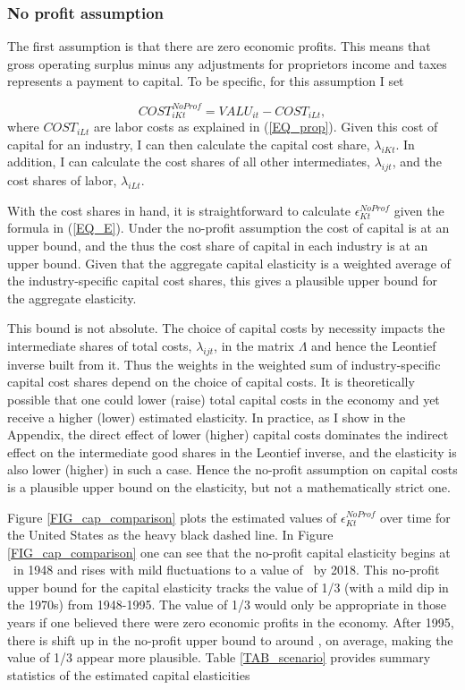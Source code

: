 \documentclass[11pt]{article}
\begin{document}
\subsubsection{No profit assumption}
The first assumption is that there are zero economic profits. This means that gross operating surplus minus any adjustments for proprietors income and taxes represents a payment to capital. To be specific, for this assumption I set

\begin{equation}
	COST^{NoProf}_{iKt} = VALU_{it} - COST_{iLt},  \label{EQ_noprofit}
\end{equation}
where $COST_{iLt}$ are labor costs as explained in (\ref{EQ_prop}). Given this cost of capital for an industry, I can then calculate the capital cost share, $\lambda_{iKt}$. In addition, I can calculate the cost shares of all other intermediates, $\lambda_{ijt}$, and the cost shares of labor, $\lambda_{iLt}$.

With the cost shares in hand, it is straightforward to calculate $\epsilon_{Kt}^{NoProf}$ given the formula in (\ref{EQ_E}). Under the no-profit assumption the cost of capital is at an upper bound, and the thus the cost share of capital in each industry is at an upper bound. Given that the aggregate capital elasticity is a weighted average of the industry-specific capital cost shares, this gives a plausible upper bound for the aggregate elasticity.

This bound is not absolute. The choice of capital costs by necessity impacts the intermediate shares of total costs, $\lambda_{ijt}$, in the matrix $\Lambda$ and hence the Leontief inverse built from it. Thus the weights in the weighted sum of industry-specific capital cost shares depend on the choice of capital costs. It is theoretically possible that one could lower (raise) total capital costs in the economy and yet receive a higher (lower) estimated elasticity. In practice, as I show in the Appendix, the direct effect of lower (higher) capital costs dominates the indirect effect on the intermediate good shares in the Leontief inverse, and the elasticity is also lower (higher) in such a case. Hence the no-profit assumption on capital costs is a plausible upper bound on the elasticity, but not a mathematically strict one.

Figure \ref{FIG_cap_comparison} plots the estimated values of $\epsilon_{Kt}^{NoProf}$ over time for the United States as the heavy black dashed line. In Figure \ref{FIG_cap_comparison} one can see that the no-profit capital elasticity begins at \basefirstnoprofit \ in 1948 and rises with mild fluctuations to a value of \baselastnoprofit \ by 2018. This no-profit upper bound for the capital elasticity tracks the value of 1/3 (with a mild dip in the 1970s) from 1948-1995. The value of 1/3 would only be appropriate in those years if one believed there were zero economic profits in the economy. After 1995, there is shift up in the no-profit upper bound to around \baselatenoprofit, on average, making the value of 1/3 appear more plausible. Table \ref{TAB_scenario} provides summary statistics of the estimated capital elasticities
\end{document}
